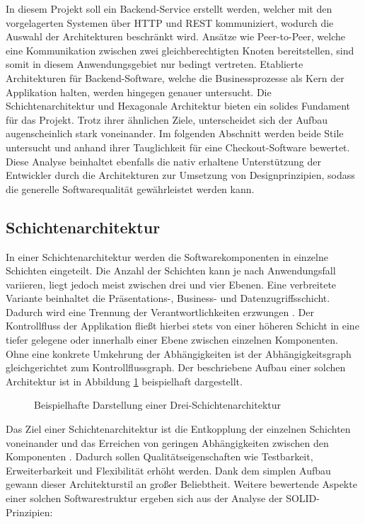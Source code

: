 In diesem Projekt soll ein Backend-Service erstellt werden, welcher mit den vorgelagerten Systemen über \acrshort{HTTP} und \acrshort{REST} kommuniziert, wodurch die Auswahl der Architekturen beschränkt wird. Ansätze wie Peer-to-Peer, welche eine Kommunikation zwischen zwei gleichberechtigten Knoten bereitstellen, sind somit in diesem Anwendungsgebiet nur bedingt vertreten. Etablierte Architekturen für Backend-Software, welche die Businessprozesse als Kern der Applikation halten, werden hingegen genauer untersucht. Die Schichtenarchitektur und Hexagonale Architektur bieten ein solides Fundament für das Projekt. Trotz ihrer ähnlichen Ziele, unterscheidet sich der Aufbau augenscheinlich stark voneinander. Im folgenden Abschnitt werden beide Stile untersucht und anhand ihrer Tauglichkeit für eine Checkout-Software bewertet. Diese Analyse beinhaltet ebenfalls die nativ erhaltene Unterstützung der Entwickler durch die Architekturen zur Umsetzung von Designprinzipien, sodass die generelle Softwarequalität gewährleistet werden kann.

\subsection{Schichtenarchitektur}

In einer Schichtenarchitektur werden die Softwarekomponenten in einzelne Schichten eingeteilt. Die Anzahl der Schichten kann je nach Anwendungsfall variieren, liegt jedoch meist zwischen drei und vier Ebenen. Eine verbreitete Variante beinhaltet die Präsentations-, Business- und Datenzugriffsschicht. Dadurch wird eine Trennung der Verantwortlichkeiten erzwungen \cite[S. 185]{Buschmann.2011}. Der Kontrollfluss der Applikation fließt hierbei stets von einer höheren Schicht in eine tiefer gelegene oder innerhalb einer Ebene zwischen einzelnen Komponenten. Ohne eine konkrete Umkehrung der Abhängigkeiten ist der Abhängigkeitsgraph gleichgerichtet zum Kontrollflussgraph. \cite[S. 17ff.]{Fowler.2011} Der beschriebene Aufbau einer solchen Architektur ist in Abbildung \ref{fig:Schichtenarchitektur} beispielhaft dargestellt. 

\begin{figure}[htbp]
	\centering
	\large
	
	\caption{Beispielhafte Darstellung einer Drei-Schichtenarchitektur}
	\label{fig:Schichtenarchitektur}
\end{figure}

Das Ziel einer Schichtenarchitektur ist die Entkopplung der einzelnen Schichten voneinander und das Erreichen von geringen Abhängigkeiten zwischen den Komponenten \cite[S. 17]{Fowler.2011}. Dadurch sollen Qualitätseigenschaften wie Testbarkeit, Erweiterbarkeit und Flexibilität erhöht werden. Dank dem simplen Aufbau gewann dieser Architekturstil an großer Beliebtheit. Weitere bewertende Aspekte einer solchen Softwarestruktur ergeben sich aus der Analyse der SOLID-Prinzipien:

